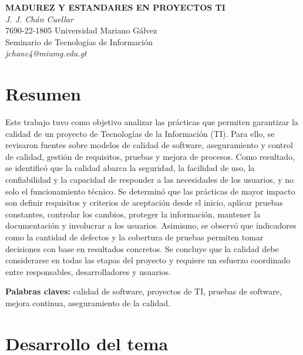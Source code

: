\documentclass[12pt,letterpaper]{article}
\begin{document}
\begin{center}
    \textbf{MADUREZ Y ESTANDARES EN PROYECTOS TI} \\[1.5ex]
    \textit{J. J. Chán Cuellar} \\[1.5ex]
    7690-22-1805 \quad Universidad Mariano Gálvez \\[1.0ex]
    Seminario de Tecnologías de Información \\[1.0ex]
    \textit{jchanc4@miumg.edu.gt}
\end{center}

\section*{Resumen}
Este trabajo tuvo como objetivo analizar las prácticas que permiten garantizar la calidad de un proyecto de Tecnologías de la Información (TI). Para ello, se revisaron fuentes sobre modelos de calidad de software, aseguramiento y control de calidad, gestión de requisitos, pruebas y mejora de procesos. Como resultado, se identificó que la calidad abarca la seguridad, la facilidad de uso, la confiabilidad y la capacidad de responder a las necesidades de los usuarios, y no solo el funcionamiento técnico. Se determinó que las prácticas de mayor impacto son definir requisitos y criterios de aceptación desde el inicio, aplicar pruebas constantes, controlar los cambios, proteger la información, mantener la documentación y involucrar a los usuarios. Asimismo, se observó que indicadores como la cantidad de defectos y la cobertura de pruebas permiten tomar decisiones con base en resultados concretos. Se concluye que la calidad debe considerarse en todas las etapas del proyecto y requiere un esfuerzo coordinado entre responsables, desarrolladores y usuarios.

\vspace{1em}
\noindent\textbf{Palabras claves:}  calidad de software, proyectos de TI, pruebas de software, mejora continua, aseguramiento de la calidad.

\section*{ Desarrollo del tema}
\end{document}
